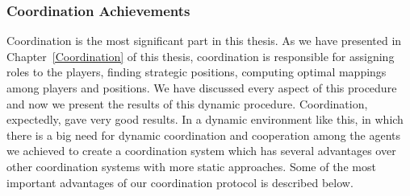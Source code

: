 \subsubsection*{Coordination Achievements}
Coordination is the most significant part in this thesis. As we have presented in Chapter~\ref{Coordination} of this thesis, coordination is responsible for assigning roles to the players, finding strategic positions, computing optimal mappings among players and positions. We have discussed every aspect of this procedure and now we present the results of this dynamic procedure. Coordination, expectedly, gave very good results. In a dynamic environment like this, in which there is a big need for dynamic coordination and cooperation among the agents we achieved 
to create a coordination system which has several advantages over other coordination systems with more static approaches. Some of the most important advantages of our coordination protocol is described below.

